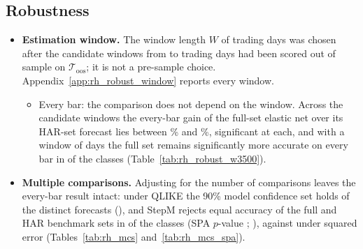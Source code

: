 
\subsection{Robustness}
\label{sec:rh_results_robust}
\begin{itemize}
\item \textbf{Estimation window.} The window length $W$ of \rhorWindowDays{} trading days was chosen after the
  \rhwsNWinWord{} candidate windows from \rhwsWinMin{} to \rhrbWinLong{} trading days had been
  scored out of sample on $\mathcal T_{\mathrm{oos}}$; it is not a pre-sample choice. Appendix~\ref{app:rh_robust_window}
  reports every window.
  \begin{itemize}
  \item Every bar: the comparison does not depend on the window. Across the candidate windows the every-bar gain of the
    full-set elastic net over its HAR-set forecast lies between \rhwsEnetBarPctMin{}\% and
    \rhwsEnetBarPctMax{}\%, significant at each, and with a window of \rhrbWinLong{} days the full set
    remains significantly more accurate on every bar in \rhrbNFullLowerSigBarLong{} of the \rhrbNModelsLong{} classes
    (Table~\ref{tab:rh_robust_w3500}).
  \end{itemize}
\item \textbf{Multiple comparisons.} Adjusting for the number of comparisons leaves the every-bar result intact: under
  QLIKE the 90\% model confidence set \citep{HansenLundeNason2011} holds \rhmcsBarQlikeTmaxNNinety{} of the
  \rhmcsNModels{} distinct forecasts (\rhmcsBarQlikeTmaxSetNinety), and StepM \citep{RomanoWolf2005} rejects
  equal accuracy of the full and HAR benchmark sets in \rhmcsBarQAfNRej{} of the \rhmcsNAlt{} classes (SPA
  $p$-value \rhmcsBarQAfSpaC; \citealp{Hansen2005}), against \rhmcsBarMAfNRejWord{} under squared error
  (Tables~\ref{tab:rh_mcs} and~\ref{tab:rh_mcs_spa}).
\end{itemize}

